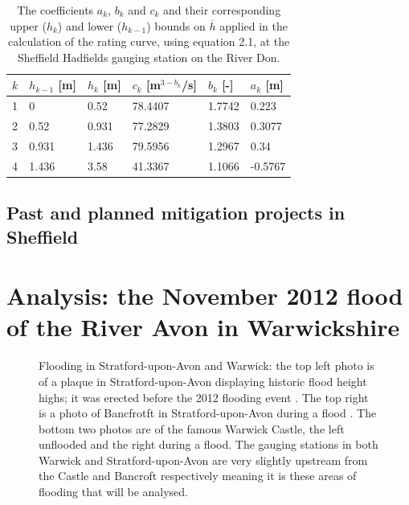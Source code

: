 \documentclass[11pt,a4paper]{article}
\begin{document}
\begin{table}[H]
\centering
\begin{tabular}{l|l|l|l|l|l}
$k$ & $h_{k-1}$ [m] & $h_k$ [m] & $c_k$ [m$^{3-b_k}$/s] & $b_k$ [-] & $a_k$ [m]\\
\hline
1 & 0 & 0.52 & 78.4407 & 1.7742 & 0.223 \\
2 & 0.52 & 0.931 & 77.2829 & 1.3803 & 0.3077 \\
3 & 0.931 & 1.436 & 79.5956 & 1.2967 & 0.34 \\
4 & 1.436 & 3.58 & 41.3367 & 1.1066 & -0.5767 \\
\end{tabular}
\caption{The coefficients $a_k$, $b_k$ and $c_k$ and their corresponding upper ($h_k$) and lower ($h_{k-1}$) bounds on $\overline{h}$ \cite{Calder-Don} applied in the calculation of the rating curve, using equation 2.1, at the Sheffield Hadfields gauging station on the River Don.}
\end{table}

\subsection{Past and planned mitigation projects in Sheffield}

\section{Analysis: the November 2012 flood of the River Avon in Warwickshire}
\begin{figure}[H]
\centering
{}
\hfill
{}
\caption{Flooding in Stratford-upon-Avon and Warwick: the top left photo is of a plaque in Stratford-upon-Avon displaying historic flood height highs{;} it was erected before the 2012 flooding event \cite{plaque}. The top right is a photo of Bancfrotft in Stratford-upon-Avon during a flood \cite{strat-flood}. The bottom two photos are of the famous Warwick Castle, the left \cite{castle} unflooded and the right \cite{warwick-flooding} during a flood. The gauging stations in both Warwick and Stratford-upon-Avon are very slightly upstream from the Castle and Bancroft respectively meaning it is these areas of flooding that will be analysed.}
\end{figure}
\end{document}
